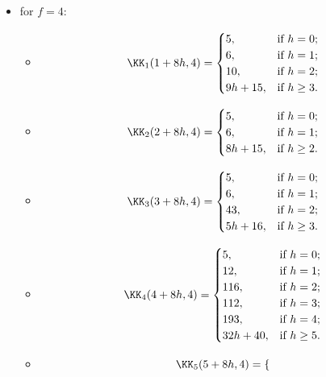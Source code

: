 \begin{definition}
\begin{itemize}
\begin{itemize}
\begin{itemize}
\item[] $$\KK_{4}(4+6h,3)=
\begin{cases}
4,&\text{if\ } h=0;\\
9h+14,&\text{if\ } h\geq 1.
\end{cases}$$
\item[] $$\KK_{5}(5+6h,3)=
\begin{cases}
9,&\text{if\ } h=0;\\
26,&\text{if\ } h=1;\\
\frac{21}{2}h^2+\frac{27}{2}h,&\text{if\ } h\geq 2.
\end{cases}$$
\item[] $$\KK_{6}(6+6h,3)=3h+5.$$
\end{itemize}
\item[$\bullet$] for $f=4$:
\begin{itemize}
\item[] $$\KK_{1}(1+8h,4)=
\begin{cases}
5,&\text{if\ } h=0;\\
6,&\text{if\ } h=1;\\
10,&\text{if\ } h=2;\\
9h+15,&\text{if\ } h\geq 3.
\end{cases}$$
\item[] $$\KK_{2}(2+8h,4)=
\begin{cases}
5,&\text{if\ } h=0;\\
6,&\text{if\ } h=1;\\
8h+15,&\text{if\ } h\geq 2.
\end{cases}$$
\item[] $$\KK_{3}(3+8h,4)=
\begin{cases}
5,&\text{if\ } h=0;\\
6,&\text{if\ } h=1;\\
43,&\text{if\ } h=2;\\
5h+16,&\text{if\ } h\geq 3.
\end{cases}$$
\item[] $$\KK_{4}(4+8h,4)=
\begin{cases}
5,&\text{if\ } h=0;\\
12,&\text{if\ } h=1;\\
116,&\text{if\ } h=2;\\
112,&\text{if\ } h=3;\\
193,&\text{if\ } h=4;\\
32h+40,&\text{if\ } h\geq 5.
\end{cases}$$
\item[] $$\KK_{5}(5+8h,4)=
\begin{cases}

\end{cases}$$
\end{itemize}
\end{itemize}
\end{itemize}
\end{definition}
